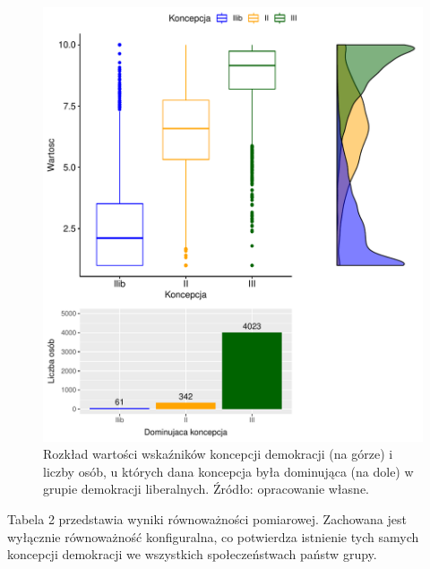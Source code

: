 \documentclass[12pt]{article}
\begin{document}
\begin{figure}

{\centering \includegraphics{text_ASA_files/figure-latex/stats-west-1} 

}

\caption{Rozkład wartości wskaźników koncepcji demokracji (na górze) i liczby osób, u których dana koncepcja była dominująca (na dole) w grupie demokracji liberalnych. Źródło: opracowanie własne.}\label{fig:stats-west}
\end{figure}

Tabela 2 przedstawia wyniki równoważności pomiarowej. Zachowana jest wyłącznie równoważność konfiguralna, co potwierdza istnienie tych samych koncepcji demokracji we wszystkich społeczeństwach państw grupy.

\begin{table}

\caption{\label{tab:tab-west}Wyniki analizy równoważności pomiarowej dla grupy demokracji liberalnych. Źródło: opracowanie własne.}
\centering
{}
\end{table}
\end{document}
